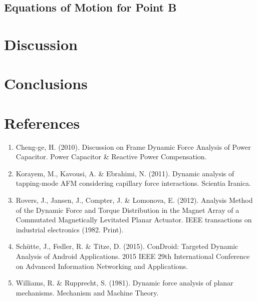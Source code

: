 \documentclass[12pt, titlepage]{article}
\begin{document}
\subsection{Equations of Motion for Point B}
\newpage
\section{Discussion}
\newpage
\section{Conclusions}
\newpage
\section{References}
\begin{enumerate}
    \item \label{item:cheng2010} Cheng-ge, H. (2010). Discussion on Frame
      Dynamic Force Analysis of Power Capacitor. Power Capacitor \& Reactive
      Power Compensation.

    \item \label{item:korayem2011} Korayem, M., Kavousi, A. \& Ebrahimi, N.
    (2011). Dynamic analysis of tapping-mode AFM considering capillary force
    interactions. Scientia Iranica.

    \item \label{item:rovers2012} Rovers, J., Jansen, J., Compter, J. \&
    Lomonova, E. (2012). Analysis Method of the Dynamic Force and Torque
    Distribution in the Magnet Array of a Commutated Magnetically Levitated
    Planar Actuator. IEEE transactions on industrial electronics (1982. Print).

    \item \label{item:shutte2015} Schütte, J., Fedler, R. \& Titze, D. (2015).
    ConDroid: Targeted Dynamic Analysis of Android Applications. 2015 IEEE 29th
    International Conference on Advanced Information Networking and
    Applications.

    \item \label{item:williams1981} Williams, R. \& Rupprecht, S. (1981). Dynamic
    force analysis of planar mechanisms. Mechanism and Machine Theory.
\end{enumerate}
\end{document}
